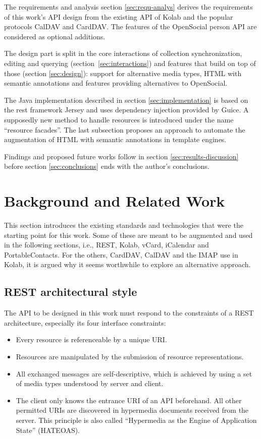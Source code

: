 \documentclass[11pt,a4paper,headsepline,twoside]{scrartcl}		%
\newcommand{\citeurl}[2]{\url{#1} (#2)}
\begin{document}
The requirements and analysis section \ref{sec:requ-analys} derives the
requirements of this work's API design from the existing API of Kolab and the
popular protocols CalDAV and CardDAV. The features of the OpenSocial person API
are considered as optional additions.

The design part is split in the core interactions of collection synchronization,
editing and querying (section~\ref{sec:interactions}) and features that build on
top of those (section \ref{sec:design}): support for alternative media types,
HTML with semantic annotations and features providing alternatives to OpenSocial.

The Java implementation described in section \ref{sec:implementation} is based
on the rest framework Jersey and uses dependency injection provided by Guice. A
supposedly new method to handle resources is introduced under the name
``resource facades''. The last subsection proposes an approach to automate the
augmentation of HTML with semantic annotations in template engines.

Findings and proposed future works follow in section
\ref{sec:results-discussion} before section \ref{sec:conclusions} ends with the
author's conclusions.


\section{Background and Related Work}
\label{sec:backgr-relat-work}

This section introduces the existing standards and technologies that were the
starting point for this work. Some of these are meant to be augmented and used
in the following sections, i.e., REST, Kolab, vCard, iCalendar and
PortableContacts. For the others, CardDAV, CalDAV and the IMAP use in Kolab, it
is argued why it seems worthwhile to explore an alternative approach.

\subsection{REST architectural style}

The API to be designed in this work must respond to the constraints of a REST
architecture, especially its four interface
constraints\cite[sec. 5.1.5]{Fielding2000}:

\begin{itemize}
\item Every resource is referenceable by a unique URI.
\item Resources are manipulated by the submission of resource representations.
\item All exchanged messages are self-descriptive, which is achieved by using a
  set of media types understood by server and client.
\item The client only knows the entrance URI of an API beforehand. All other
  permitted URIs are discovered in hypermedia documents received from the
  server. This principle is also called ``Hypermedia as the Engine of
  Application State'' (HATEOAS).
\end{itemize}
\end{document}
